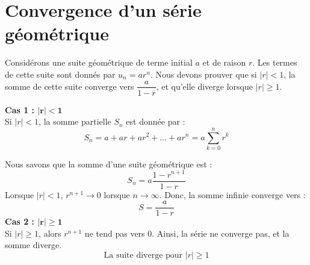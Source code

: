 \documentclass{report}
\begin{document}
    \section{Convergence d'un série géométrique}
    \begin{Preuve}{}{}
        \hypertarget{Convergence série géométrique}{Considérons} une suite géométrique de terme initial $a$ et de raison $r$. Les
        termes de cette suite sont donnés par $u_n = ar^n$. Nous devons prouver que si 
        $|r| < 1$, la somme de cette suite converge vers $\dfrac{a}{1 - r}$, et qu'elle
        diverge lorsque $|r| \geq 1$.

        \textbf{Cas 1 : $\boldsymbol{|r| < 1}$}\\

        Si $|r| < 1$, la somme partielle $S_n$ est donnée par :
        \[
        S_n = a + ar + ar^2 + \dots + ar^n = a \sum_{k=0}^{n} r^k
        \]

        Nous savons que la somme d'une suite géométrique est :
        \[
        S_n = a \frac{1 - r^{n+1}}{1 - r}
        \]
        Lorsque $|r| < 1$, $r^{n+1} \to 0$ lorsque $n \to \infty$. Donc, la somme 
        infinie converge vers :
        \[
        \boxed{S = \frac{a}{1 - r}}
        \]
        \textbf{Cas 2 : $\boldsymbol{|r| \geq 1}$}\\

        Si $|r| \geq 1$, alors $r^{n+1}$ ne tend pas vers $0$. Ainsi, la série ne 
        converge pas, et la somme diverge. 
        \[
        \boxed{\text{La suite diverge pour } |r| \geq 1}
    \]       
    \end{Preuve}
\end{document}
